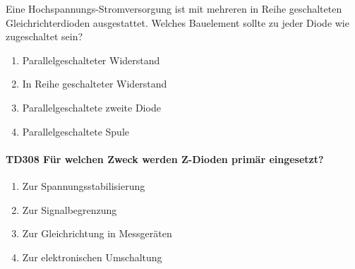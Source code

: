 \documentclass[8pt]{article}
\begin{document}
\begin{enumerate}
\begin{enumerate}[nolistsep,label=\Alph*]
{ Eine Hochspannungs-Stromversorgung ist mit mehreren in Reihe geschalteten Gleichrichterdioden ausgestattet. Welches Bauelement sollte zu jeder Diode wie zugeschaltet sein?}
\begin{enumerate}[nolistsep,label=\Alph*]
\item Parallelgeschalteter Widerstand 
\item In Reihe geschalteter Widerstand
\item Parallelgeschaltete zweite Diode
\item Parallelgeschaltete Spule 
\end{enumerate}

\paragraph*{TD308 Für welchen Zweck werden Z-Dioden primär eingesetzt?}
\begin{enumerate}[nolistsep,label=\Alph*]
\item Zur Spannungsstabilisierung
\item Zur Signalbegrenzung
\item Zur Gleichrichtung in Messgeräten
\item Zur elektronischen Umschaltung
\end{enumerate}


\end{enumerate}
\end{enumerate}
\end{document}
